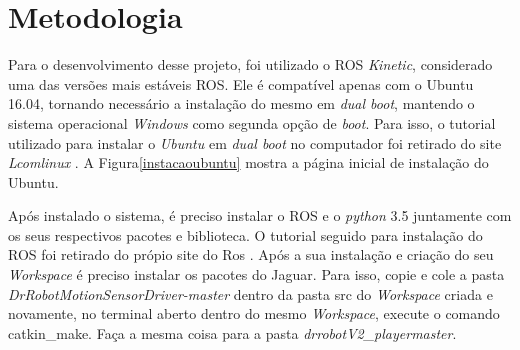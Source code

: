 \chapter{Metodologia}
\label{chap:metodologia}

Para o desenvolvimento desse projeto, foi utilizado o ROS\textit{ Kinetic}, considerado uma das versões mais estáveis ROS. Ele é compatível apenas com o Ubuntu 16.04, tornando necessário a instalação do mesmo em \textit{dual boot}, mantendo o sistema operacional \textit{Windows} como segunda opção de \textit{boot}. Para isso, o tutorial utilizado para instalar o \textit{Ubuntu} em \textit{dual boot} no computador foi retirado do site \textit{Lcomlinux} \cite{ubuntu}. A Figura\ref{instacaoubuntu} mostra a página inicial de instalação do Ubuntu.

	\begin{figure}[H]
		\centering
	\end{figure}
	
Após instalado o sistema, é preciso instalar o ROS e o \textit{python} 3.5 juntamente com os seus respectivos pacotes e biblioteca. O tutorial seguido para instalação do ROS foi retirado do própio site do Ros \cite{rosInstalacao}. Após a sua instalação e criação do seu \textit{Workspace} é preciso instalar os pacotes do Jaguar. Para isso, copie e cole a pasta \textit{DrRobotMotionSensorDriver-master} dentro da pasta src do \textit{Workspace} criada e novamente, no terminal aberto dentro do mesmo \textit{Workspace}, execute o comando catkin\_make. Faça a mesma coisa para a pasta \textit{drrobotV2\_player\-master}.

